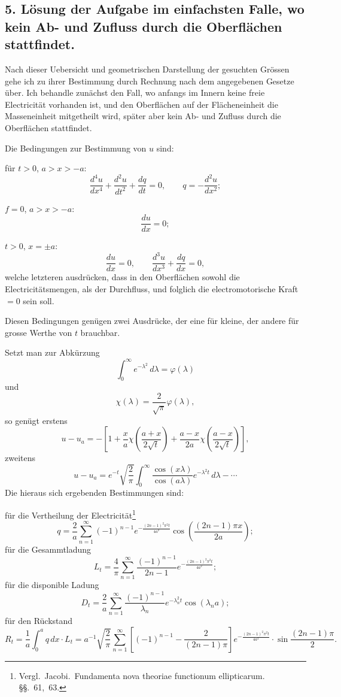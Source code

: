 \documentclass[12pt,a4paper]{article}
\begin{document}
\newpage

\subsection*{5. L\"osung der Aufgabe im einfachsten Falle, wo kein Ab- und Zufluss durch die Oberfl\"achen stattfindet.}

Nach dieser Uebersicht und geometrischen Darstellung der gesuchten Gr\"ossen gehe ich zu ihrer Bestimmung durch Rechnung nach dem angegebenen Gesetze \"uber. Ich behandle zun\"achst den Fall, wo anfangs im Innern keine freie Electricit\"at vorhanden ist, und den Oberfl\"achen auf der Fl\"acheneinheit die Masseneinheit mitgetheilt wird, sp\"ater aber kein Ab- und Zufluss durch die Oberfl\"achen stattfindet.

Die Bedingungen zur Bestimmung von $u$ sind:

f\"ur $t > 0$, $a > x > -a$:
\[
\frac{d^4u}{dx^4} + \frac{d^2u}{dt^2} + \frac{dq}{dt} = 0, \qquad q = -\frac{d^2u}{dx^2};
\]

$f = 0$, $a > x > -a$:
\[
\frac{du}{dx} = 0;
\]

$t > 0$, $x = \pm a$:
\[
\frac{du}{dx} = 0, \qquad \frac{d^3u}{dx^3} + \frac{dq}{dx} = 0,
\]
welche letzteren ausdr\"ucken, dass in den Oberfl\"achen sowohl die Electricit\"atsmengen, als der Durchfluss, und folglich die electromotorische Kraft $=0$ sein soll.

Diesen Bedingungen gen\"ugen zwei Ausdr\"ucke, der eine f\"ur kleine, der andere f\"ur grosse Werthe von $t$ brauchbar.

Setzt man zur Abk\"urzung
\[
\int_0^\infty e^{-\lambda^2}\,d\lambda = \varphi(\lambda)
\]
und
\[
\chi(\lambda) = \frac{2}{\sqrt{\pi}}\varphi(\lambda),
\]
so gen\"ugt erstens
\[
u - u_a = -\left[1 + \frac{x}{a}\chi\left(\frac{a+x}{2\sqrt{t}}\right) + \frac{a-x}{2a}\chi\left(\frac{a-x}{2\sqrt{t}}\right)\right],
\]
zweitens
\[
u - u_a = e^{-t}\sqrt{\frac{2}{\pi}}\int_0^\infty \frac{\cos(x\lambda)}{\cos(a\lambda)}e^{-\lambda^2t}\,d\lambda - \cdots
\]
Die hieraus sich ergebenden Bestimmungen sind:

f\"ur die Vertheilung der Electricit\"at\footnote{Vergl.\ Jacobi.\ Fundamenta nova theoriae functionum ellipticarum. \S\S.~61,~63.}
\[
q = \frac{2}{a}\sum_{n=1}^{\infty}(-1)^{n-1}e^{-\frac{(2n-1)^2\pi^2t}{4a^2}}\cos\left(\frac{(2n-1)\pi x}{2a}\right);
\]
f\"ur die Gesammtladung
\[
L_t = \frac{4}{\pi}\sum_{n=1}^{\infty}\frac{(-1)^{n-1}}{2n-1}e^{-\frac{(2n-1)^2\pi^2t}{4a^2}};
\]
f\"ur die disponible Ladung
\[
D_t = \frac{2}{a}\sum_{n=1}^{\infty}\frac{(-1)^{n-1}}{\lambda_n}e^{-\lambda_n^2t}\cos(\lambda_n a);
\]
f\"ur den R\"uckstand
\[
R_t = \frac{1}{a}\int_0^a q\,dx \cdot L_t = a^{-1}\sqrt{\frac{2}{\pi}}\sum_{n=1}^{\infty}\left[(-1)^{n-1} - \frac{2}{(2n-1)\pi}\right]e^{-\frac{(2n-1)^2\pi^2t}{4a^2}}\cdot\sin\frac{(2n-1)\pi}{2}.
\]
\end{document}
